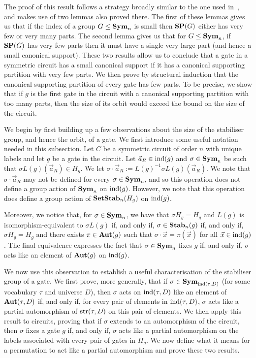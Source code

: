 \documentclass[../paper.tex]{subfiles}
\begin{document}
The proof of this result follows a strategy broadly similar to the one
used in~\cite{AndersonD17}, and makes use of two lemmas also proved
there.  The first of these lemmas gives us that if the index of a group $G \leq
\text{\textbf{Sym}}_n$ is small then $\text{\textbf{SP}}(G)$ either has very few or very many parts.
The second lemma gives us that for $G \leq \text{\textbf{Sym}}_n$, if $\text{\textbf{SP}}(G)$ has very few parts
then it must have a single very large part (and hence a small canonical
support).  These two results allow us to conclude that a gate in a symmetric
circuit has a small canonical support if it has a canonical supporting partition
with very few parts.  We then prove by structural induction that the
canonical supporting partition of every gate has few parts.  To be
precise, we show that if $g$ is the first gate in the circuit with a canonical
supporting partition with too many parts, then the size of its orbit
would exceed the bound on the size of the circuit.

We begin by first building up a few observations about the size of the
stabiliser group, and hence the orbit, of a gate. We first introduce some useful
notation needed in this subsection. Let $C$ be a symmetric circuit of order $n$
with unique labels and let $g$ be a gate in the circuit. Let $\vec{a}_R \in
\text{\upshape ind}(g)$ and $\sigma \in \text{\textbf{Sym}}_n$ be such that $\sigma L(g)(\vec{a}_R) \in H_g$.
We let $\sigma \cdot \vec{a}_R := L(g)^{-1}\sigma L(g)(\vec{a}_R)$. We note that
$\sigma \cdot \vec{a}_R$ may not be defined for every $\sigma \in \text{\textbf{Sym}}_n$, and
so this operation does not define a group action of $\text{\textbf{Sym}}_n$ on $\text{\upshape ind}(g)$.
However, we note that this operation does define a group action of
$\text{\textbf{SetStab}}_n(H_g)$ on $\text{\upshape ind}(g)$.

Moreover, we notice that, for $\sigma \in \text{\textbf{Sym}}_n$, we have that $\sigma H_g =
H_g$ and $L(g)$ is isomorphism-equivalent to $\sigma L(g)$ if, and only if,
$\sigma \in \text{\textbf{Stab}}_n(g)$ if, and only if, $\sigma H_g = H_g$ and there exists
$\pi \in \text{\textbf{Aut}}(g)$ such that $\sigma \cdot \vec{x} = \pi (\vec{x})$ for all
$\vec{x} \in \text{\upshape ind}(g)$. The final equivalence expresses the fact that $\sigma \in
\text{\textbf{Sym}}_n$ fixes $g$ if, and only if, $\sigma$ acts like an element of $\text{\textbf{Aut}}(g)$ on
$\text{\upshape ind}(g)$.

We now use this observation to establish a useful characterisation of the
stabiliser group of a gate. We first prove, more generally, that if $\sigma \in
\text{\textbf{Sym}}_{\text{\upshape ind}(\tau, D)}$ (for some vocabulary $\tau$ and universe $D$), then
$\sigma$ acts on $\text{\upshape ind}(\tau, D)$ like an element of $\text{\textbf{Aut}}(\tau, D)$ if, and only
if, for every pair of elements in $\text{\upshape ind}(\tau, D)$, $\sigma$ acts like a partial
automorphism of $\text{str}(\tau, D)$ on this pair of elements. We then apply this
result to circuits, proving that if $\sigma$ extends to an automorphism of the
circuit, then $\sigma$ fixes a gate $g$ if, and only if, $\sigma$ acts like
a partial automorphism on the labels associated with every pair of gates in
$H_g$. We now define what it means for a permutation to act like a partial
automorphism and prove these two results.
\end{document}
